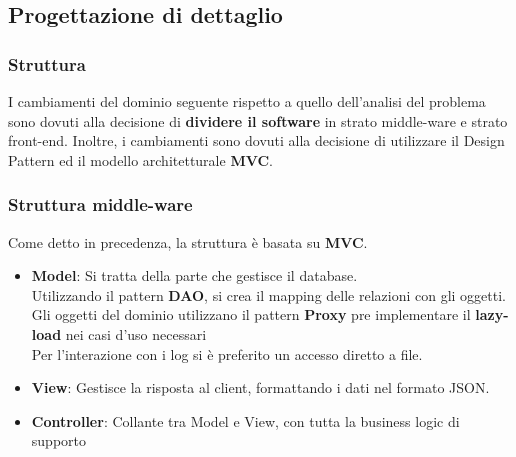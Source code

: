 \documentclass[a4paper]{article}
\begin{document}
\newpage

\subsection{Progettazione di dettaglio}


\subsubsection{Struttura}

I cambiamenti del dominio seguente rispetto a quello dell’analisi del problema sono dovuti
alla decisione di \textbf{dividere il software} in strato middle-ware e strato front-end. Inoltre, i cambiamenti sono dovuti alla decisione di utilizzare il Design Pattern ed il modello architetturale \textbf{MVC}.

\subsubsection{Struttura middle-ware}

Come detto in precedenza, la struttura è basata su \textbf{MVC}.

\begin{itemize}
    \item \textbf{Model}: Si tratta della parte che gestisce il database.\\Utilizzando il pattern \textbf{DAO}, si crea il mapping delle relazioni con gli oggetti.\\Gli oggetti del dominio utilizzano il pattern \textbf{Proxy} pre implementare il \textbf{lazy-load} nei casi d'uso necessari\\Per l'interazione con i log si è preferito un accesso diretto a file.
    \item \textbf{View}: Gestisce la risposta al client, formattando i dati nel formato JSON.
    \item \textbf{Controller}: Collante tra Model e View, con tutta la business logic di supporto
\end{itemize}

\end{document}

